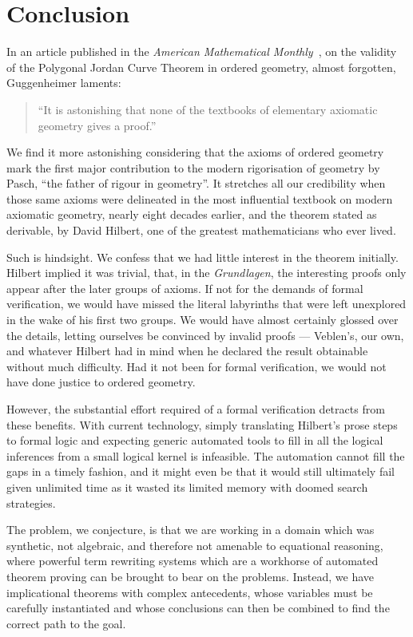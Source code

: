 \chapter{Conclusion}\label{chapter:Conclusion}
In an article published in the \emph{American Mathematical Monthly}~\cite{GuggenheimerJordanProof}, on the validity of the Polygonal Jordan Curve Theorem in ordered geometry, almost forgotten, Guggenheimer laments:
\begin{quotation}
  ``It is astonishing that none of the textbooks of elementary axiomatic geometry gives a proof.''
\end{quotation}

We find it more astonishing considering that the axioms of ordered geometry mark the first major contribution to the modern rigorisation of geometry by Pasch, ``the father of rigour in geometry''. It stretches all our credibility when those same axioms were delineated in the most influential textbook on modern axiomatic geometry, nearly eight decades earlier,  and the theorem stated as derivable, by David Hilbert, one of the greatest mathematicians who ever lived.

Such is hindsight. We confess that we had little interest in the theorem initially. Hilbert implied it was trivial, that, in the \emph{Grundlagen}, the interesting proofs only appear after the later groups of axioms. If not for the demands of formal verification, we would have missed the literal labyrinths that were left unexplored in the wake of his first two groups. We would have almost certainly glossed over the details, letting ourselves be convinced by invalid proofs --- Veblen's, our own, and whatever Hilbert had in mind when he declared the result obtainable without much difficulty. Had it not been for formal verification, we would not have done justice to ordered geometry.

However, the substantial effort required of a formal verification detracts from these benefits. With current technology, simply translating Hilbert's prose steps to formal logic and expecting generic automated tools to fill in all the logical inferences from a small logical kernel is infeasible. The automation cannot fill the gaps in a timely fashion, and it might even be that it would still ultimately fail given unlimited time as it wasted its limited memory with doomed search strategies.

The problem, we conjecture, is that we are working in a domain which was synthetic, not algebraic, and therefore not amenable to equational reasoning, where powerful term rewriting systems which are a workhorse of automated theorem proving can be brought to bear on the problems. Instead, we have implicational theorems with complex antecedents, whose variables must be carefully instantiated and whose conclusions can then be combined to find the correct path to the goal.

